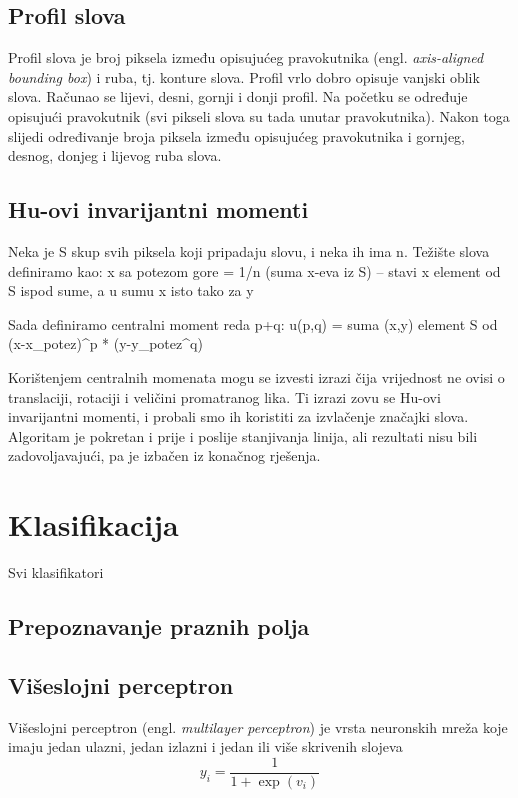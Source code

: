 \documentclass[a4paper,twocolumn,dvipdfm]{article}
\begin{document}
\subsection{Profil slova}
Profil slova je broj piksela između opisujućeg pravokutnika (engl. \emph{axis-aligned bounding box}) i ruba, tj. konture slova. Profil vrlo dobro opisuje vanjski oblik slova. Računao se lijevi, desni, gornji i donji profil. Na početku se određuje opisujući pravokutnik (svi pikseli slova su tada unutar pravokutnika). Nakon toga slijedi određivanje broja piksela između opisujućeg pravokutnika i gornjeg, desnog, donjeg i lijevog ruba slova. 

\subsection{Hu-ovi invarijantni momenti}
Neka je S skup svih piksela koji pripadaju slovu, i neka ih ima n.
Težište slova definiramo kao:
x sa potezom gore = 1/n (suma x-eva iz S) -- stavi x element od S ispod sume, a u sumu x
isto tako za y

Sada definiramo centralni moment reda p+q:
u(p,q) = suma (x,y) element S od (x-x_potez)^p * (y-y_potez^q)

Korištenjem centralnih momenata mogu se izvesti izrazi čija vrijednost ne ovisi o translaciji, rotaciji i veličini promatranog lika.
Ti izrazi zovu se Hu-ovi invarijantni momenti, i probali smo ih koristiti za izvlačenje značajki slova.
Algoritam je pokretan i prije i poslije stanjivanja linija, ali rezultati nisu bili zadovoljavajući, pa je izbačen iz konačnog rješenja.


\section{Klasifikacija}
Svi klasifikatori 

\subsection{Prepoznavanje praznih polja}

\subsection{Višeslojni perceptron}
Višeslojni perceptron \cite{rosenblatt1958perceptron} (engl. \emph{multilayer
perceptron}) je vrsta neuronskih mreža koje imaju jedan ulazni, jedan izlazni i
jedan ili više skrivenih slojeva
\begin{equation}
y_i = \frac{1}{1 + \exp(v_i)}
\label{equation:sig}
\end{equation}
\end{document}
